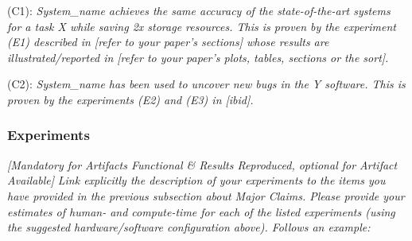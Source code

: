 \begin{compactdesc}

    \item[(C1):] \textit{System\_name achieves the same accuracy of the state-of-the-art
    systems for a task X while saving 2x storage resources. This is proven by
    the experiment (E1) described in [refer to your paper's sections] whose
    results are illustrated/reported in [refer to your paper's plots, tables,
    sections or the sort].}

    \item[(C2):] \textit{System\_name has been used to uncover new bugs in the Y
    software. This is proven by the experiments (E2) and (E3) in [ibid].}

\end{compactdesc}

\subsubsection{Experiments}
{\em [Mandatory for Artifacts Functional \& Results Reproduced, optional for
Artifact Available]} \textit{Link explicitly the description of your experiments
to the items you have provided in the previous subsection about Major Claims.
Please provide your estimates of human- and compute-time for each of the listed
experiments (using the suggested hardware/software configuration above). Follows
an example:}

